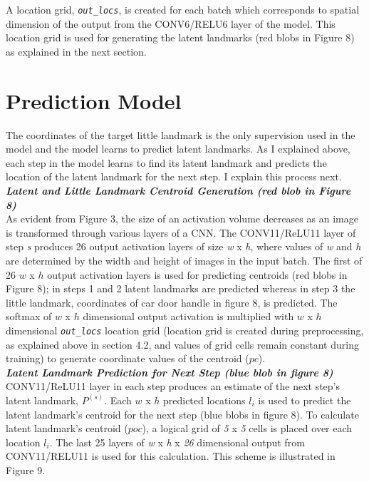 \documentclass [11pt,letterpaper ,twoside ,openany ]{report}
\begin{document}
    A location grid, \textit{\texttt{out\_locs}},  is created for each batch which corresponds to spatial dimension of the output from the CONV6/RELU6 layer of the model. This location grid is used for generating the latent landmarks (red blobs in Figure 8) as explained in the next section.

    \section{Prediction Model}
    The coordinates of the target little landmark is the only supervision used in the model and the model learns to predict latent landmarks. As I explained above, each step in the model learns to find its latent landmark and predicts the location of the latent landmark for the next step. I explain this process next.\\

    \noindent
    \textbf{\textit{Latent and Little Landmark Centroid Generation (red blob in Figure 8)}}\\
    As evident from Figure 3, the size of an activation volume decreases as an image is transformed through various layers of a CNN. The CONV11/ReLU11 layer of step \textit {s} produces 26 output activation layers of size \textit {w} x \textit {h}, where values of \textit {w} and \textit {h} are determined by the width and height of images in the input batch. The first of 26 \(w\) x \(h\) output activation layers is used for predicting centroids (red blobs in Figure 8); in steps 1 and 2 latent landmarks are predicted whereas in step 3 the little landmark, coordinates of car door handle in figure 8, is predicted. The softmax of \(w\) x \(h\) dimensional output activation is multiplied with \(w\) x \(h\) dimensional \textit{\texttt{out\_locs}} location grid (location grid is created during preprocessing, as explained above in section 4.2, and values of grid cells remain constant during training) to generate coordinate values of the centroid (\(pc\)).\\

    \noindent
    \textbf{\textit{Latent Landmark Prediction for Next Step (blue blob in figure 8)}}\\
    CONV11/ReLU11 layer in each step produces an estimate of the next step's latent landmark, \(P^{(s)}\). Each \(w\) x \(h\) predicted locations \(l_i\) is used to predict the latent landmark's centroid for the next step (blue blobs in figure 8). To calculate latent landmark's centroid (\(poc\)), a logical grid of \textit {5} x \textit {5} cells is placed over each location \(l_i\). The last 25 layers of \textit {w} x \textit {h} x \textit {26} dimensional output from CONV11/RELU11 is used for this calculation. This scheme is illustrated in Figure 9.
\end{document}
